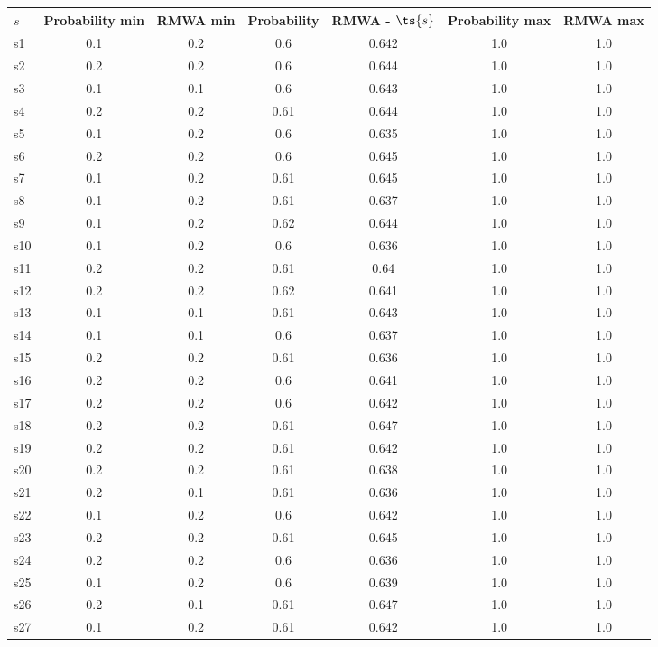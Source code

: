 \documentclass{article}
\begin{document}
\noindent\begin{tabular}{|l|c|c|c|c|c|c|}
\hline
$s$& Probability min & RMWA min & Probability & RMWA - $\ts{s}$ & Probability max & RMWA max\\
\hline
s1 &0.1 & 0.2 & 0.6 & 0.642 & 1.0 & 1.0\\
\hline
s2 &0.2 & 0.2 & 0.6 & 0.644 & 1.0 & 1.0\\
\hline
s3 &0.1 & 0.1 & 0.6 & 0.643 & 1.0 & 1.0\\
\hline
s4 &0.2 & 0.2 & 0.61 & 0.644 & 1.0 & 1.0\\
\hline
s5 &0.1 & 0.2 & 0.6 & 0.635 & 1.0 & 1.0\\
\hline
s6 &0.2 & 0.2 & 0.6 & 0.645 & 1.0 & 1.0\\
\hline
s7 &0.1 & 0.2 & 0.61 & 0.645 & 1.0 & 1.0\\
\hline
s8 &0.1 & 0.2 & 0.61 & 0.637 & 1.0 & 1.0\\
\hline
s9 &0.1 & 0.2 & 0.62 & 0.644 & 1.0 & 1.0\\
\hline
s10 &0.1 & 0.2 & 0.6 & 0.636 & 1.0 & 1.0\\
\hline
s11 &0.2 & 0.2 & 0.61 & 0.64 & 1.0 & 1.0\\
\hline
s12 &0.2 & 0.2 & 0.62 & 0.641 & 1.0 & 1.0\\
\hline
s13 &0.1 & 0.1 & 0.61 & 0.643 & 1.0 & 1.0\\
\hline
s14 &0.1 & 0.1 & 0.6 & 0.637 & 1.0 & 1.0\\
\hline
s15 &0.2 & 0.2 & 0.61 & 0.636 & 1.0 & 1.0\\
\hline
s16 &0.2 & 0.2 & 0.6 & 0.641 & 1.0 & 1.0\\
\hline
s17 &0.2 & 0.2 & 0.6 & 0.642 & 1.0 & 1.0\\
\hline
s18 &0.2 & 0.2 & 0.61 & 0.647 & 1.0 & 1.0\\
\hline
s19 &0.2 & 0.2 & 0.61 & 0.642 & 1.0 & 1.0\\
\hline
s20 &0.2 & 0.2 & 0.61 & 0.638 & 1.0 & 1.0\\
\hline
s21 &0.2 & 0.1 & 0.61 & 0.636 & 1.0 & 1.0\\
\hline
s22 &0.1 & 0.2 & 0.6 & 0.642 & 1.0 & 1.0\\
\hline
s23 &0.2 & 0.2 & 0.61 & 0.645 & 1.0 & 1.0\\
\hline
s24 &0.2 & 0.2 & 0.6 & 0.636 & 1.0 & 1.0\\
\hline
s25 &0.1 & 0.2 & 0.6 & 0.639 & 1.0 & 1.0\\
\hline
s26 &0.2 & 0.1 & 0.61 & 0.647 & 1.0 & 1.0\\
\hline
s27 &0.1 & 0.2 & 0.61 & 0.642 & 1.0 & 1.0\\

\end{tabular}
\end{document}

